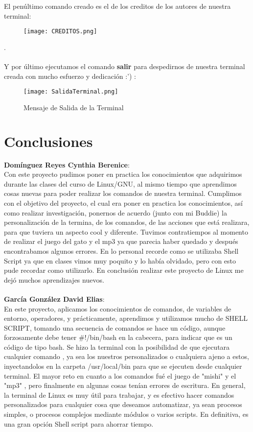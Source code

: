 \documentclass[titlepage]{article}
\begin{document}
El penúltimo comando creado es el de los creditos de los autores de nuestra terminal: 

\begin{figure}[H]
    \centering
    \texttt{[image: CREDITOS.png]}
    
\end{figure}
.\\\\

Y por último ejecutamos el comando \textbf{salir} para despedirnos de nuestra terminal creada con mucho esfuerzo y dedicación :') :

\begin{figure}[H]
    \centering
    \texttt{[image: SalidaTerminal.png]}
    \caption{Mensaje de Salida de la Terminal }
    \label{fig:ejemplo}
\end{figure}

\pagebreak
\section{Conclusiones}
\textbf{Domínguez Reyes Cynthia Berenice}:\\
Con este proyecto pudimos poner en practica los conocimientos que adquirimos durante las clases del curso de Linux/GNU, al mismo tiempo que aprendimos cosas nuevas para poder realizar los comandos de nuestra terminal. Cumplimos con el objetivo del proyecto, el cual era poner en practica los conocimientos, así como realizar investigación, ponernos de acuerdo (junto con mi Buddie) la personalización de la termina, de los comandos, de las acciones que está realizara, para que tuviera un aspecto cool y diferente. Tuvimos contratiempos al momento de realizar el juego del gato y el mp3 ya que parecia haber quedado y después encontrabamos algunos errores. En lo personal recorde como se utilizaba Shell Script ya que en clases vimos muy poquito y lo había olvidado, pero con esto pude recordar como utilizarlo. 
En conclusión realizar este proyecto de Linux me dejó muchos aprendizajes nuevos. \\\\

\textbf{García González David Elias}:\\
En este proyecto, aplicamos los conocimientos de comandos, de variables de entorno, operadores, y prácticamente, aprendimos y utilizamos mucho de SHELL SCRIPT, tomando una secuencia de comandos se hace un código, aunque forzosamente debe tener #!/bin/bash en la cabecera, para indicar que es un código de tipo bash. Se hizo la terminal con la posibilidad de que ejecutara cualquier comando , ya sea los nuestros personalizados o cualquiera ajeno a estos, inyectandolos en la carpeta /usr/local/bin para que se ejecuten desde cualquier terminal. El mayor reto en cuanto a los comandos fué el juego de "mishi" y el "mp3" , pero finalmente en algunas cosas tenían errores de escritura. En general, la terminal de Linux es muy útil para trabajar, y es efectivo hacer comandos personalizados para cualquier cosa que deseamos automatizar, ya sean procesos simples, o procesos complejos mediante módulos o varios scripts. En definitiva, es una gran opción Shell script para ahorrar tiempo.
\end{document}
